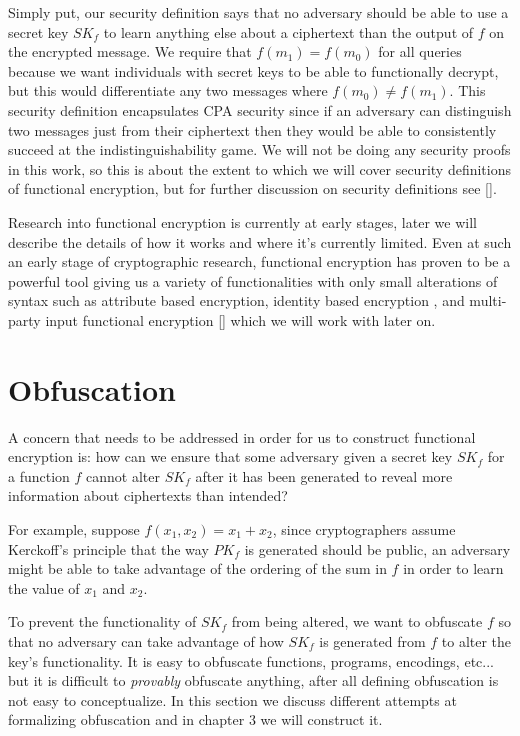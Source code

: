 \documentclass[12pt,twoside]{reedthesis}
\begin{document}
\par Simply put, our security definition says that no adversary should be able to use a secret key $SK_f$ to learn anything else about a ciphertext than the output of $f$ on the encrypted message. We require that $f(m_1)=f(m_0)$ for all queries because we want individuals with secret keys to be able to functionally decrypt, but this would differentiate any two messages where $f(m_0) \not= f(m_1)$. This security definition encapsulates CPA security since if an adversary can distinguish two messages just from their ciphertext then they would be able to consistently succeed at the indistinguishability game. We will not be doing any security proofs in this work, so this is about the extent to which we will cover security definitions of functional encryption, but for further discussion on security definitions see [\cite{funcenc}].

\par Research into functional encryption is currently at early stages, later we will describe the details of how it works and where it's currently limited. Even at such an early stage of cryptographic research, functional encryption has proven to be a powerful tool giving us a variety of functionalities with only small alterations of syntax such as attribute based encryption, identity based encryption , and multi-party input functional encryption [\cite{funcenc}] which we will work with later on. 

    
    

    \section{Obfuscation}
    A concern that needs to be addressed in order for us to construct functional encryption is: how can we ensure that some adversary given a secret key $SK_f$ for a function $f$ cannot alter $SK_f$ after it has been generated to reveal more information about ciphertexts than intended? 
    \par For example, suppose $f(x_1,x_2) = x_1 + x_2$, since cryptographers assume Kerckoff's principle that the way $PK_f$ is generated should be public, an adversary might be able to take advantage of the ordering of the sum in $f$ in order to learn the value of $x_1$ and $x_2$.
    \par To prevent the functionality of $SK_f$ from being altered, we want to obfuscate $f$ so that no adversary can take advantage of how $SK_f$ is generated from $f$ to alter the key's functionality. It is easy to obfuscate functions, programs, encodings, etc... but it is difficult to \textit{provably} obfuscate anything, after all defining obfuscation is not easy to conceptualize. In this section we discuss different attempts at formalizing obfuscation and in chapter 3 we will construct it.
    
\end{document}
